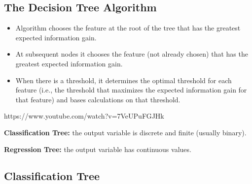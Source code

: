 \subsection{The Decision Tree Algorithm}

\begin{itemize}
    \item Algorithm chooses the feature at the root of the tree that has the greatest expected information gain.
    \item At subsequent nodes it chooses the feature (not already chosen) that has the greatest expected information gain.
    \item When there is a threshold, it determines the optimal threshold for each feature (i.e., the threshold that maximizes the expected information gain for that feature) and bases calculations on that threshold.
\end{itemize}

https://www.youtube.com/watch?v=7VeUPuFGJHk

\textbf{Classification Tree:} the output variable is discrete and finite (usually binary).

\textbf{Regression Tree:} the output variable has continuous values.

\subsection{Classification Tree}

